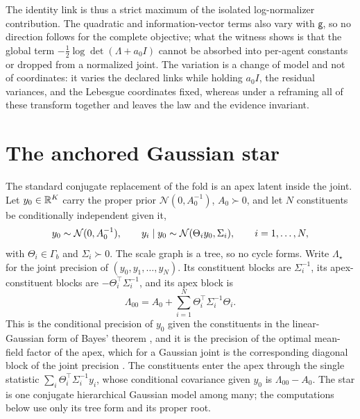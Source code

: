 \medskip
The identity link is thus a strict maximum of the isolated log-normalizer contribution.
The quadratic and information-vector terms also vary with \(\mathsf g\), so no direction
follows for the complete objective; what the witness shows is that the global term
\(-\tfrac12\log\det(\Lambda+a_0I)\) cannot be absorbed into per-agent constants or dropped
from a normalized joint. The variation is a change of model and not of coordinates: it
varies the declared links while holding \(a_0I\), the residual variances, and the Lebesgue
coordinates fixed, whereas under a reframing all of these transform together and
 leaves the law and the evidence invariant.

\section{The anchored Gaussian star}
\label{sec:obs-star}

The standard conjugate replacement of the fold is an apex latent inside the joint. Let
\(y_0\in\mathbb R^K\) carry the proper prior \(\mathcal N(0,A_0^{-1})\), \(A_0\succ0\), and let \(N\)
constituents be conditionally independent given it,
\begin{equation}
y_0\sim\mathcal N(0,A_0^{-1}),
\qquad
y_i\mid y_0\sim\mathcal N(\Theta_iy_0,\Sigma_i),
\qquad
i=1,\dots,N,
\label{eq:obs-star}
\end{equation}
with \(\Theta_i\in\Gamma_b\) and \(\Sigma_i\succ0\). The scale graph is a tree, so no cycle
forms. Write \(\Lambda_\star\) for the joint precision of \((y_0,y_1,\dots,y_N)\). Its
constituent blocks are \(\Sigma_i^{-1}\), its apex-constituent blocks are
\(-\Theta_i^\top\Sigma_i^{-1}\), and its apex block is
\begin{equation}
\Lambda_{00}=A_0+\sum_{i=1}^N\Theta_i^\top\Sigma_i^{-1}\Theta_i .
\label{eq:obs-precision-addition}
\end{equation}
This is the conditional precision of \(y_0\) given the constituents in the linear-Gaussian
form of Bayes' theorem \citep[Sec.~2.3.3]{Bishop2006}, and it is the precision of the
optimal mean-field factor of the apex, which for a Gaussian joint is the corresponding
diagonal block of the joint precision \citep[Sec.~10.1.2]{Bishop2006}. The constituents
enter the apex through the single statistic \(\sum_i\Theta_i^\top\Sigma_i^{-1}y_i\), whose
conditional covariance given \(y_0\) is \(\Lambda_{00}-A_0\). The star is one conjugate
hierarchical Gaussian model among many; the computations below use only its tree form
and its proper root.

